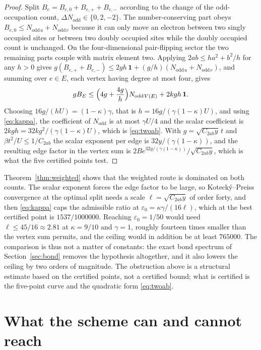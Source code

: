 \documentclass[11pt]{article}
\theoremstyle{plain}
\theoremstyle{definition}
\newcommand{\Nodd}{N_{\mathrm{odd}}}
\begin{document}
\begin{proof}
Split $B_e=B_{e,0}+B_{e,+}+B_{e,-}$ according to the change of the odd-occupation
count, $\Delta\Nodd\in\{0,2,-2\}$. The number-conserving part obeys
$B_{e,0}\le\Nodd{}_{u}+\Nodd{}_{v}$ because it can only move an electron between two
singly occupied sites or between two doubly occupied sites while the doubly occupied
count is unchanged. On the four-dimensional pair-flipping sector the two remaining
parts couple with matrix element two. Applying $2ab\le ha^{2}+b^{2}/h$ for any $h>0$
gives $g(B_{e,+}+B_{e,-})\le2gh\,\mathbf{1}+(g/h)(\Nodd{}_{u}+\Nodd{}_{v})$, and
summing over $e\in E$, each vertex having degree at most four, gives
\[
gB_E\le\Bigl(4g+\frac{4g}{h}\Bigr)\Nodd{}_{V(E)}+2kgh\,\mathbf{1}.
\]
Choosing $16g/(hU)=(1-\kappa)\gamma$, that is
$h=16g/(\gamma(1-\kappa)U)$, and using \eqref{eq:kappa}, the coefficient of
$\Nodd$ is at most $\gamma U/4$ and the scalar coefficient is
$2kgh=32kg^{2}/(\gamma(1-\kappa)U)$, which is \eqref{eq:twoab}. With
$g=\sqrt{C_{2ab}y}\,t$ and $\beta t^{2}/U\le1/C_{2ab}$ the scalar exponent per edge is
$32y/(\gamma(1-\kappa))$, and the resulting edge factor in the vertex sum is
$2Be^{32y/(\gamma(1-\kappa))}/\sqrt{C_{2ab}y}$, which is what the five certified
points test.
\end{proof}

Theorem~\ref{thm:weighted} shows that the weighted route is dominated on both counts.
The scalar exponent forces the edge factor to be large, so Koteck\'y--Preiss
convergence at the optimal split needs a scale $\ell=\sqrt{C_{2ab}y}$ of order forty,
and then \eqref{eq:kappa} caps the admissible ratio at
$\varepsilon_0=\kappa\gamma/(16\ell)$, which at the best certified point is
$1537/1000000$. Reaching $\varepsilon_0=1/50$ would need $\ell\le 45/16\approx 2.81$
at $\kappa=9/10$ and $\gamma=1$, roughly fourteen times smaller than the
vertex sum permits, and the ceiling would in addition be at least $765000$. The
comparison is thus not a matter of constants: the exact bond spectrum of
Section~\ref{sec:bond} removes the hypothesis altogether, and it also lowers the
ceiling by two orders of magnitude. The obstruction above is a structural estimate
based on the certified points, not a certified bound; what is certified is the
five-point curve and the quadratic form \eqref{eq:twoab}.

\section{What the scheme can and cannot reach}\label{sec:floors}
\end{document}
